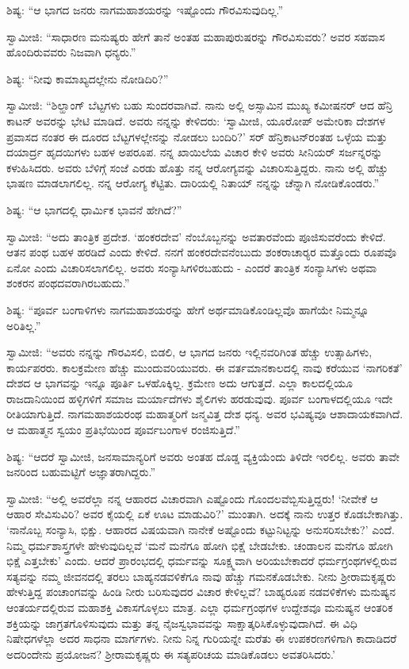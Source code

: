  ಶಿಷ್ಯ: “ಆ ಭಾಗದ ಜನರು ನಾಗಮಹಾಶಯರನ್ನು ಇಷ್ಟೊಂದು ಗೌರವಿಸುವುದಿಲ್ಲ.” 

 ಸ್ವಾಮೀಜಿ: “ಸಾಧಾರಣ ಮನುಷ್ಯರು ಹೇಗೆ ತಾನೆ ಅಂತಹ ಮಹಾಪುರುಷರನ್ನು ಗೌರವಿಸುವರು? ಅವರ ಸಹವಾಸ ಹೊಂದಿರುವವರು ನಿಜವಾಗಿ ಧನ್ಯರು.” 

 ಶಿಷ್ಯ: “ನೀವು ಕಾಮಾಖ್ಯದಲ್ಲೇನು ನೋಡಿದಿರಿ?” 

 ಸ್ವಾಮೀಜಿ: “ಶಿಲ್ಹಾಂಗ್ ಬೆಟ್ಟಗಳು ಬಹು ಸುಂದರವಾಗಿವೆ. ನಾನು ಅಲ್ಲಿ ಅಸ್ಸಾಮಿನ ಮುಖ್ಯ ಕಮೀಷನರ್ ಆದ ಹೆನ್ರಿ ಕಾಟನ್ ಅವರನ್ನು ಭೇಟಿ ಮಾಡಿದೆ. ಅವರು ನನ್ನನ್ನು ಕೇಳಿದರು: ‘ಸ್ವಾಮೀಜಿ, ಯೂರೋಪ್ ಅಮೇರಿಕಾ ದೇಶಗಳ ಪ್ರವಾಸದ ನಂತರ ಈ ದೂರದ ಬೆಟ್ಟಗಳಲ್ಲೇನನ್ನು ನೋಡಲು ಬಂದಿರಿ?’ ಸರ್ ಹೆನ್ರಿಕಾಟನ್‍ರಂತಹ ಒಳ್ಳೆಯ ಮತ್ತು ದಯಾರ್ದ್ರ ಹೃದಯಿಗಳು ಬಹಳ ಅಪರೂಪ. ನನ್ನ ಖಾಯಿಲೆಯ ವಿಚಾರ ಕೇಳಿ ಅವರು ಸೀನಿಯರ್ ಸರ್ಜನ್ನರನ್ನು ಕಳುಹಿಸಿದರು. ಅವರು ಬೆಳಿಗ್ಗೆ ಸಂಜೆ ಎರಡು ಹೊತ್ತು ನನ್ನ ಆರೋಗ್ಯವನ್ನು ವಿಚಾರಿಸುತ್ತಿದ್ದರು. ನಾನು ಅಲ್ಲಿ ಹೆಚ್ಚು ಭಾಷಣ ಮಾಡಲಾಗಲಿಲ್ಲ. ನನ್ನ ಆರೋಗ್ಯ ಕೆಟ್ಟಿತು. ದಾರಿಯಲ್ಲಿ ನಿತಾಯ್ ನನ್ನನ್ನು ಚೆನ್ನಾಗಿ ನೋಡಿಕೊಂಡರು.” 

 ಶಿಷ್ಯ: “ಆ ಭಾಗದಲ್ಲಿ ಧಾರ್ಮಿಕ ಭಾವನೆ ಹೇಗಿದೆ?” 

 ಸ್ವಾಮೀಜಿ: “ಅದು ತಾಂತ್ರಿಕ ಪ್ರದೇಶ. ‘ಹಂಕರದೇವ’ ನೆಂಬೊಬ್ಬನನ್ನು ಅವತಾರವೆಂದು ಪೂಜಿಸುವರೆಂದು ಕೇಳಿದೆ. ಆತನ ಪಂಥ ಬಹಳ ಹರಡಿದೆ ಎಂದು ಕೇಳಿದೆ. ನನಗೆ ಹಂಕರದೇವನೆಂಬುದು ಶಂಕರಾಚಾರ‍್ಯರ ಮತ್ತೊಂದು ರೂಪವೊ ಏನೋ ಎಂದು ವಿಚಾರಿಸಲಾಗಲಿಲ್ಲ. ಅವರು ಸಂನ್ಯಾಸಿಗಳಿರಬಹುದು - ಎಂದರೆ ತಾಂತ್ರಿಕ ಸಂನ್ಯಾಸಿಗಳು ಅಥವಾ ಶಂಕರನ ಪಂಥದವರಾಗಿರಬಹುದು.” 

 ಶಿಷ್ಯ: “ಪೂರ್ವ ಬಂಗಾಳಿಗಳು ನಾಗಮಹಾಶಯರನ್ನು ಹೇಗೆ ಅರ್ಥಮಾಡಿಕೊಂಡಿಲ್ಲವೊ ಹಾಗೆಯೇ ನಿಮ್ಮನ್ನೂ ಅರಿತಿಲ್ಲ.” 

 ಸ್ವಾಮೀಜಿ: “ಅವರು ನನ್ನನ್ನು ಗೌರವಿಸಲಿ, ಬಿಡಲಿ, ಆ ಭಾಗದ ಜನರು ಇಲ್ಲಿನವರಿಗಿಂತ ಹೆಚ್ಚು ಉತ್ಸಾಹಿಗಳು, ಕಾರ್ಯಪರರು. ಕಾಲಕ್ರಮೇಣ ಹೆಚ್ಚು ಮುಂದುವರಿಯುವರು. ಈ ವರ್ತಮಾನಕಾಲದಲ್ಲಿ ನಾವು ಕರೆಯುವ ‘ನಾಗರಿಕತೆ’ ದೇಶದ ಆ ಭಾಗವನ್ನು ಇನ್ನೂ ಪೂರ್ತಿ ಒಳಹೊಕ್ಕಿಲ್ಲ. ಕ್ರಮೇಣ ಅದು ಆಗುತ್ತದೆ. ಎಲ್ಲಾ ಕಾಲದಲ್ಲಿಯೂ ರಾಜದಾನಿಯಿಂದ ಹಳ್ಳಿಗಳಿಗೆ ಸಮಾಜ ಮರ್ಯಾದೆಗಳು ಶೈಲಿಗಳು ಹರಡುವುವು. ಪೂರ್ವ ಬಂಗಾಳದಲ್ಲಿಯೂ ಇದೇ ರೀತಿಯಾಗುತ್ತಿದೆ. ನಾಗಮಹಾಶಯರಂಥ ಮಹಾತ್ಮರಿಗೆ ಜನ್ಮವಿತ್ತ ದೇಶ ಧನ್ಯ. ಅವರ ಭವಿಷ್ಯವೂ ಆಶಾದಾಯಕವಾಗಿದೆ. ಆ ಮಹಾತ್ಮನ ಸ್ವಯಂ ಪ್ರತಿಭೆಯಿಂದ ಪೂರ್ವಬಂಗಾಳ ರಂಜಿಸುತ್ತಿದೆ.” 

 ಶಿಷ್ಯ: “ಆದರೆ ಸ್ವಾಮೀಜಿ, ಜನಸಾಮಾನ್ಯರಿಗೆ ಅವರು ಅಂತಹ ದೊಡ್ಡ ವ್ಯಕ್ತಿಯೆಂದು ತಿಳಿದೇ ಇರಲಿಲ್ಲ. ಅವರು ತಾವೇ ಜನರಿಂದ ಬಹುಮಟ್ಟಿಗೆ ಅಜ್ಞಾತರಾಗಿದ್ದರು.” 

 ಸ್ವಾಮೀಜಿ: “ಅಲ್ಲಿ ಅವರೆಲ್ಲಾ ನನ್ನ ಆಹಾರದ ವಿಚಾರವಾಗಿ ಎಷ್ಟೊಂದು ಗೊಂದಲವೆಬ್ಬಿಸುತ್ತಿದ್ದರು! ‘ನೀವೇಕೆ ಆ ಆಹಾರ ಸೇವಿಸುವಿರಿ? ಅವರ ಕೈಯಲ್ಲಿ ಏಕೆ ಊಟ ಮಾಡುವಿರಿ?’ ಮುಂತಾಗಿ. ಅದಕ್ಕೆ ನಾನು ಉತ್ತರ ಕೊಡಬೇಕಾಗಿತ್ತು. ‘ನಾನೊಬ್ಬ ಸಂನ್ಯಾಸಿ, ಭಿಕ್ಷು. ಆಹಾರದ ವಿಷಯವಾಗಿ ನಾನೇಕೆ ಅಷ್ಟೊಂದು ಕಟ್ಟುನಿಟ್ಟನ್ನು ಅನುಸರಿಸಬೇಕು?’ ಎಂದೆ. ನಿಮ್ಮ ಧರ್ಮಶಾಸ್ತ್ರಗಳೇ ಹೇಳುವುದಿಲ್ಲವೆ ‘ಮನೆ ಮನೆಗೂ ಹೋಗಿ ಭಿಕ್ಷೆ ಬೇಡಬೇಕು. ಚಂಡಾಲನ ಮನೆಗೂ ಹೋಗಿ ಭಿಕ್ಷೆ ಎತ್ತಬೇಕು’ ಎಂದು. ಆದರೆ ಪ್ರಾರಂಭದಲ್ಲಿ ಧರ್ಮವನ್ನು ಸೂಕ್ಷ್ಮವಾಗಿ ಅರಿಯಬೇಕಾದರೆ ಧರ್ಮಗ್ರಂಥಗಳಲ್ಲಿರುವ ಸತ್ಯವನ್ನು ನಮ್ಮ ಜೀವನದಲ್ಲಿ ತರಲು ಬಾಹ್ಯನಡವಳಿಕೆಗೂ ನಾವು ಹೆಚ್ಚು ಗಮನಕೊಡಬೇಕು. ನೀನು ಶ‍್ರೀರಾಮಕೃಷ್ಣರು ಹೇಳುತ್ತಿದ್ದ ಪಂಚಾಂಗವನ್ನು ಹಿಂಡಿ ನೀರು ಬರಿಸುವುದರ ವಿಚಾರ ಕೇಳಿಲ್ಲವೆ? ಬಾಹ್ಯರೂಪ ನಡವಳಿಕೆಗಳು ಮನುಷ್ಯನ ಆಂತರ್ಯದಲ್ಲಿರುವ ಮಹಾಶಕ್ತಿ ವಿಕಾಸಗೊಳ್ಳಲು ಮಾತ್ರ. ಎಲ್ಲಾ ಧರ್ಮಗ್ರಂಥಗಳ ಉದ್ದೇಶವೂ‌ ಮನುಷ್ಯನ ಆಂತರಿಕ ಶಕ್ತಿಯನ್ನು ಜಾಗ್ರತಗೊಳಿಸುವುದು ಮತ್ತು ತನ್ನ ನೈಜಸ್ವಭಾವವನ್ನು ಸಾಕ್ಷಾತ್ಕರಿಸಿಕೊಳ್ಳುವುದಾಗಿದೆ. ಈ ವಿಧಿ ನಿಷೇಧಗಳೆಲ್ಲಾ ಅದರ ಸಾಧನಾ ಮಾರ್ಗಗಳು. ನೀನು ನಿನ್ನ ಗುರಿಯನ್ನೇ ಮರೆತು ಈ ಉಪಕರಣಗಳಿಗಾಗಿ ಕಾದಾಡಿದರೆ ಅದರಿಂದೇನು ಪ್ರಯೋಜನ? ಶ‍್ರೀರಾಮಕೃಷ್ಣರು ಈ ಸತ್ಯಪರಿಚಯ ಮಾಡಿಕೊಡಲು ಅವತರಿಸಿದರು.’ 

